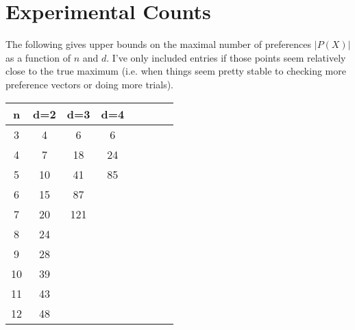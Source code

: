 \documentclass[12pt]{article}
\newcommand{\Rgz}{\mathbb{R}_{\ge 0}}
\newcommand{\1}[1]{\mathds{1}[{#1}]}
\begin{document}

\section{Experimental Counts}
  The following gives upper bounds on the maximal number
  of preferences $|P(X)|$ as a function of $n$ and $d$.
  I've only included entries if those points seem relatively
  close to the true maximum (i.e. when things seem pretty stable
  to checking more preference vectors or doing more trials).

  \begin{tabular}{c | c c c c c c c}
    n & d=2 & d=3 & d=4 \\
    \hline
    3  &  4   & 6  & 6  \\
    4  &  7   & 18 & 24 \\
    5  &  10  & 41 & 85 \\
    6  &  15  & 87  \\
    7  &  20  & 121 \\
    8  &  24  \\
    9  &  28  \\
    10 &  39  \\
    11 &  43  \\
    12 &  48  \\
  \end{tabular}

% 
% 
\end{document}
